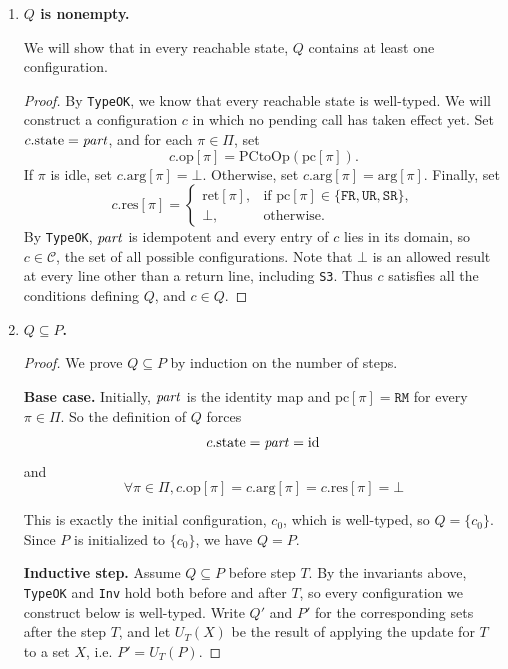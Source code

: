 \documentclass[12pt]{amsproc}
\begin{document}
\begin{enumerate}
    \item \textbf{$Q$ is nonempty.}

    We will show that in every reachable state, $Q$ contains at least one configuration.

    \begin{proof}
    By \texttt{TypeOK}, we know that every reachable state is well-typed. We will construct a configuration $c$ in which no pending call has taken effect yet. Set $c.\mathrm{state}=\mathit{part}$, and for each $\pi\in\Pi$, set
    \[
        c.\mathrm{op}[\pi]=\mathrm{PCtoOp}(\mathrm{pc}[\pi]).
    \]
    If $\pi$ is idle, set $c.\mathrm{arg}[\pi]=\bot$. Otherwise, set $c.\mathrm{arg}[\pi]=\mathrm{arg}[\pi]$. Finally, set
    \[
        c.\mathrm{res}[\pi]=
        \begin{cases}
            \mathrm{ret}[\pi],
                & \text{if } \mathrm{pc}[\pi]\in
                    \{\texttt{FR},\texttt{UR},\texttt{SR}\},\\
            \bot, & \text{otherwise}.
        \end{cases}
    \]
    By \texttt{TypeOK}, $\mathit{part}$ is idempotent and every entry of $c$ lies in its domain, so $c\in\mathcal{C}$, the set of all possible configurations. Note that $\bot$ is an allowed result at every line other than a return line, including \texttt{S3}. Thus $c$ satisfies all the conditions defining $Q$, and $c\in Q$.
    \end{proof}

    \item \textbf{$Q\subseteq P$.}

    \begin{proof}
    We prove $Q\subseteq P$ by induction on the number of steps.

    \textbf{Base case.}
    Initially, $\mathit{part}$ is the identity map and $\mathrm{pc}[\pi]=\texttt{RM}$ for every $\pi\in\Pi$. So the definition of $Q$ forces 
    \[c.\mathrm{state}= \mathit{part} =\operatorname{id}\]
    and 
    \[\forall \pi \in \Pi, c.\mathrm{op}[\pi]=c.\mathrm{arg}[\pi]=c.\mathrm{res}[\pi]=\bot\]
    
    This is exactly the initial configuration, $c_0$, which is well-typed, so $Q=\{c_0\}$. Since $P$ is initialized to $\{c_0\}$, we have $Q=P$.

    \textbf{Inductive step.}
    Assume $Q\subseteq P$ before step $T$. By the invariants above, \texttt{TypeOK} and \texttt{Inv} hold both before and after $T$, so every configuration we construct below is well-typed. Write $Q'$ and $P'$ for the corresponding sets after the step $T$, and let $U_T(X)$ be the result of applying the update for $T$ to a set $X$, i.e. $P'=U_T(P)$.


\end{proof}
\end{enumerate}
\end{document}
